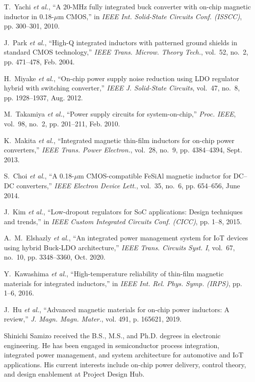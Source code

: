 \documentclass[journal]{IEEEtran}
\begin{document}
\begin{thebibliography}{10}

T.~Yachi \emph{et al.}, ``A 20-MHz fully integrated buck converter with on-chip magnetic inductor in 0.18-$\mu$m CMOS,'' in \emph{IEEE Int. Solid-State Circuits Conf. (ISSCC)}, pp. 300--301, 2010.

J.~Park \emph{et al.}, ``High-Q integrated inductors with patterned ground shields in standard CMOS technology,'' \emph{IEEE Trans. Microw. Theory Tech.}, vol.~52, no.~2, pp. 471--478, Feb. 2004.

H.~Miyake \emph{et al.}, ``On-chip power supply noise reduction using LDO regulator hybrid with switching converter,'' \emph{IEEE J. Solid-State Circuits}, vol.~47, no.~8, pp. 1928--1937, Aug. 2012.

M.~Takamiya \emph{et al.}, ``Power supply circuits for system-on-chip,'' \emph{Proc. IEEE}, vol.~98, no.~2, pp. 201--211, Feb. 2010.

K.~Makita \emph{et al.}, ``Integrated magnetic thin-film inductors for on-chip power converters,'' \emph{IEEE Trans. Power Electron.}, vol.~28, no.~9, pp. 4384--4394, Sept. 2013.

S.~Choi \emph{et al.}, ``A 0.18-$\mu$m CMOS-compatible FeSiAl magnetic inductor for DC--DC converters,'' \emph{IEEE Electron Device Lett.}, vol.~35, no.~6, pp. 654--656, June 2014.

J.~Kim \emph{et al.}, ``Low-dropout regulators for SoC applications: Design techniques and trends,'' in \emph{IEEE Custom Integrated Circuits Conf. (CICC)}, pp. 1--8, 2015.

A.~M.~Elshazly \emph{et al.}, ``An integrated power management system for IoT devices using hybrid Buck-LDO architecture,'' \emph{IEEE Trans. Circuits Syst. I}, vol.~67, no.~10, pp. 3348--3360, Oct. 2020.

Y.~Kawashima \emph{et al.}, ``High-temperature reliability of thin-film magnetic materials for integrated inductors,'' in \emph{IEEE Int. Rel. Phys. Symp. (IRPS)}, pp. 1--6, 2016.

J.~Hu \emph{et al.}, ``Advanced magnetic materials for on-chip power inductors: A review,'' \emph{J. Magn. Magn. Mater.}, vol. 491, p. 165621, 2019.

\end{thebibliography}

\begin{IEEEbiography}{Shinichi Samizo}
received the B.S., M.S., and Ph.D. degrees in electronic engineering. He has been engaged in semiconductor process integration, integrated power management, and system architecture for automotive and IoT applications. His current interests include on-chip power delivery, control theory, and design enablement at Project Design Hub.
\end{IEEEbiography}
\end{document}
